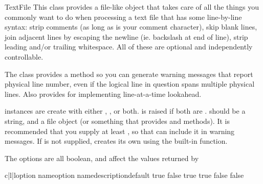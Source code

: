 \documentclass{manual}
\begin{document}
\begin{classdesc}{TextFile}{}
This class provides a file-like object that takes care of all 
the things you commonly want to do when processing a text file 
that has some line-by-line syntax: strip comments (as long as \code{\#} 
is your comment character), skip blank lines, join adjacent lines by
escaping the newline (ie. backslash at end of line), strip
leading and/or trailing whitespace.  All of these are optional
and independently controllable.

The class provides a  method so you can generate 
warning messages that report physical line number, even if the 
logical line in question spans multiple physical lines.  Also 
provides  for implementing line-at-a-time lookahead.

 instances are create with either , ,
or both.  is raised if both are .
 should be a string, and  a file object (or
something that provides  and  
methods).  It is recommended that you supply at least , 
so that  can include it in warning messages.  If 
 is not supplied,  creates its own using the 
 built-in function.

The options are all boolean, and affect the values returned by

\begin{tableiii}{c|l|l}{option name}{option name}{description}{default}
{true}
{false}
{true}
{true}
{false}
{false}
\end{tableiii}


\end{classdesc}
\end{document}
